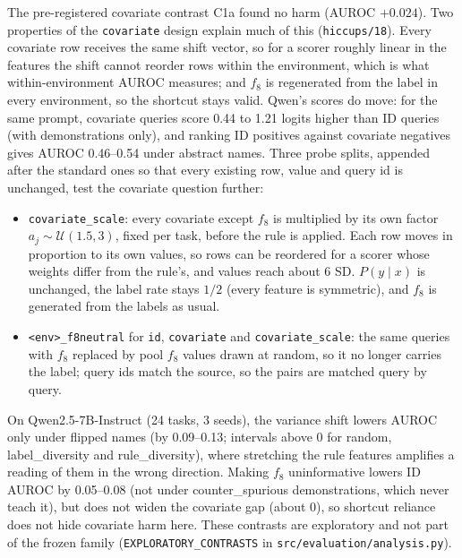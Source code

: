 \documentclass[11pt,a4paper]{article}
\newcommand{\1}{\mathbf{1}}
\theoremstyle{plain}
\theoremstyle{definition}
\theoremstyle{remark}
\begin{document}
The pre-registered covariate contrast C1a found no harm (AUROC $+0.024$).
Two properties of the \texttt{covariate} design explain much of this
(\texttt{hiccups/18}). Every covariate row receives the same shift vector, so
for a scorer roughly linear in the features the shift cannot reorder rows
within the environment, which is what within-environment AUROC measures; and
$f_8$ is regenerated from the label in every environment, so the shortcut
stays valid. Qwen's scores do move: for the same prompt, covariate queries
score 0.44 to 1.21 logits higher than ID queries (with demonstrations only),
and ranking ID positives against covariate negatives gives AUROC 0.46--0.54
under abstract names. Three probe splits, appended after the standard ones
so that every existing row, value and query id is unchanged, test the
covariate question further:
\begin{itemize}[nosep]
  \item \texttt{covariate\_scale}: every covariate except $f_8$ is
        multiplied by its own factor $a_j \sim \mathcal{U}(1.5, 3)$, fixed
        per task, before the rule is applied. Each row moves in proportion to
        its own values, so rows can be reordered for a scorer whose weights
        differ from the rule's, and values reach about 6 SD. $P(y \mid x)$ is
        unchanged, the label rate stays $1/2$ (every feature is symmetric),
        and $f_8$ is generated from the labels as usual.
  \item \texttt{<env>\_f8neutral} for \texttt{id}, \texttt{covariate} and
        \texttt{covariate\_scale}: the same queries with $f_8$ replaced by
        pool $f_8$ values drawn at random, so it no longer carries the label;
        query ids match the source, so the pairs are matched query by query.
\end{itemize}
On Qwen2.5-7B-Instruct (24 tasks, 3 seeds), the variance shift lowers AUROC
only under flipped names (by 0.09--0.13; intervals above 0 for random,
label\_diversity and rule\_diversity), where stretching the rule features
amplifies a reading of them in the wrong direction. Making $f_8$
uninformative lowers ID AUROC by 0.05--0.08 (not under counter\_spurious
demonstrations, which never teach it), but does not widen the covariate gap
(about 0), so shortcut reliance does not hide covariate harm here. These
contrasts are exploratory and not part of the frozen family
(\texttt{EXPLORATORY\_CONTRASTS} in \texttt{src/evaluation/analysis.py}).
\end{document}
